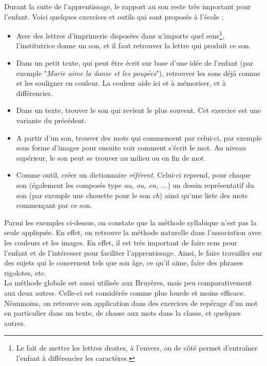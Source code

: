 Durant la suite de l'apprentissage, le rapport au son reste très important pour l'enfant. Voici quelques exercices et outils qui sont proposés à l'école :
\begin{itemize}
\item Avec des lettres d'imprimerie disposées dans n'importe quel sens\footnote{Le fait de mettre les lettres droites, à l'envers, ou de côté permet d'entraîner l'enfant à différencier les caractères.}, l'institutrice donne un son, et il faut retrouver la lettre qui produit ce son.
\item Dans un petit texte, qui peut être écrit sur base d'une idée de l'enfant (par exemple "\textit{Marie aime la danse et les poupées}"), retrouver les sons déjà connus et les souligner en couleur. La couleur aide ici et à mémoriser, et à différencier.
\item Dans un texte, trouver le son qui revient le plus souvent. Cet exercice est une variante du précédent.
\item A partir d'un son, trouver des mots qui commencent par celui-ci, par exemple sous forme d'images pour ensuite voir comment s'écrit le mot. Au niveau supérieur, le son peut se trouver au milieu ou en fin de mot.
\item Comme outil, créer un dictionnaire \textit{référent}. Celui-ci reprend, pour chaque son (également les composés type \textit{au, ou, en, ...}) un dessin représentatif du son (par exemple une chouette pour le son \textit{ch}) ainsi qu'une liste des mots commençant par ce son.\\
\end{itemize}

Parmi les exemples ci-dessus, on constate que la méthode syllabique n'est pas la seule appliquée. En effet, on retrouve la méthode naturelle dans l'association avec les couleurs et les images. En effet, il est très important de faire sens pour l'enfant et de l'intéresser pour faciliter l'apprentissage. Ainsi, le faire travailler sur des sujets qui le concernent tels que son âge, ce qu'il aime, faire des phrases rigolotes, etc.\\

La méthode globale est aussi utilisée aux Bruyères, mais peu comparativement aux deux autres. Celle-ci est considérée comme plus lourde et moins efficace. Néanmoins, on retrouve son application dans des exercices de repérage d'un mot en particulier dans un texte, de chasse aux mots dans la classe, et quelques autres.\\

